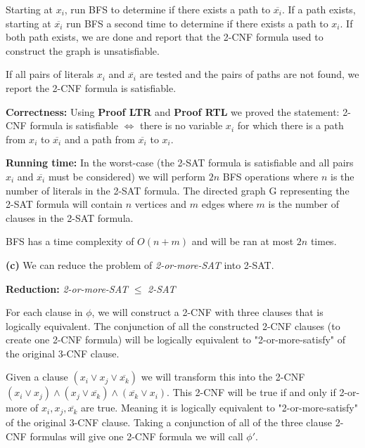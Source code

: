 \documentclass[11pt]{article}
\renewcommand\part[1]{\vspace{.10in}\textbf{(#1)}}
\newcommand\correctness{\vspace{.10in}\textbf{Correctness: }}
\newcommand\runtime{\vspace{.10in}\textbf{Running time: }}
\begin{document}
	Starting at $x_i$, run BFS to determine if there exists a path to $\overline{x_i}$. If a path exists, starting at $\overline{x_i}$ run BFS a second time to determine if there exists a path to $x_i$. If both path exists, we are done and report that the 2-CNF formula used to construct the graph is unsatisfiable.
	
	If all pairs of literals $x_i$ and $\overline{x_i}$ are tested and the pairs of paths are not found, we report the 2-CNF formula is satisfiable.
	
\correctness Using \textbf{Proof LTR} and \textbf{Proof RTL} we proved the statement: 2-CNF formula is satisfiable $\iff$ there is no variable $x_i$ for which there is a path from $x_i$ to $\overline{x_i}$ and a path from $\overline{x_i}$ to $x_i$.

\runtime In the worst-case (the 2-SAT formula is satisfiable and all pairs $x_i$ and $\overline{x_i}$ must be considered) we will perform $2n$ BFS operations where $n$ is the number of literals in the 2-SAT formula. The directed graph G representing the 2-SAT formula will contain $n$ vertices and $m$ edges where $m$ is the number of clauses in the 2-SAT formula.

	BFS has a time complexity of $O(n + m)$ and will be ran at most $2n$ times.
	

\part{c} We can reduce the problem of \textit{2-or-more-SAT} into 2-SAT.

\textbf{Reduction:} \textit{2-or-more-SAT} $\leq$ \textit{2-SAT}

For each clause in $\phi$, we will construct a 2-CNF with three clauses that is logically equivalent. The conjunction of all the constructed 2-CNF clauses (to create one 2-CNF formula) will be logically equivalent to "2-or-more-satisfy" of the original 3-CNF clause.

Given a clause $(x_i \lor x_j \lor \overline{x_k})$ we will transform this into the 2-CNF $(x_i \lor x_j) \land (x_j \lor \overline{x_k}) \land (\overline{x_k} \lor x_i)$. This 2-CNF will be true if and only if 2-or-more of $x_i, x_j, \overline{x_k}$ are true. Meaning it is logically equivalent to "2-or-more-satisfy" of the original 3-CNF clause. Taking a conjunction of all of the three clause 2-CNF formulas will give one 2-CNF formula we will call $\phi\prime$.
\end{document}

